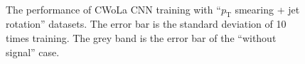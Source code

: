\documentclass[12pt]{article}
\begin{document}
		\begin{figure}[htpb]
			\centering
			 \\
			\caption{The performance of CWoLa CNN training with ``$p_{\text{T}}$ smearing + jet rotation'' datasets. The error bar is the standard deviation of 10 times training. The grey band is the error bar of the ``without signal'' case.}
			\label{fig:acc_auc_curve_origin_pt_jet_aug_1_3_res_25_75}
		\end{figure}
\end{document}
